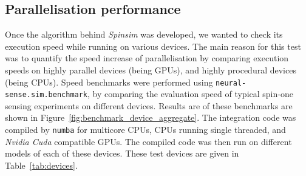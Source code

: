 \documentclass{jors}
\begin{document}
	\subsection{Parallelisation performance}
		Once the algorithm behind \emph{Spinsim} was developed, we wanted to check its execution speed while running on various devices.
		The main reason for this test was to quantify the speed increase of parallelisation by comparing execution speeds on highly parallel devices (being GPUs), and highly procedural devices (being CPUs).
		Speed benchmarks were performed using \texttt{neural-sense.sim.benchmark}, by comparing the evaluation speed of typical spin-one sensing experiments on different devices.
		Results are of these benchmarks are shown in Figure~\ref{fig:benchmark_device_aggregate}.
		The integration code was compiled by \texttt{numba} for multicore CPUs, CPUs running single threaded, and \emph{Nvidia Cuda} compatible GPUs.
		The compiled code was then run on different models of each of these devices.
		These test devices are given in Table~\ref{tab:devices}.
\end{document}
